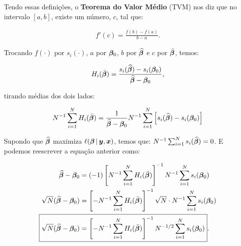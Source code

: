 \documentclass[11pt, oneside, a4paper, article]{article}
\numberwithin{equation}{section}
\begin{document}
\begin{description}
Tendo essas definições, o \textbf{Teorema do Valor Médio} (TVM) nos diz que no intervalo $[a, b]$, existe um número, $c$, tal que:

\vspace{-1 em}
\begin{align*}
f'(c) = \frac{f(b) - f(a)}{b - a}.
\end{align*}

\vspace{1 em}
\begin{center}
\end{center}
\vspace{1 em}

Trocando 
$f(\cdot)$ por $s_{i}(\cdot)$, 
$a$ por $\boldsymbol{\beta}_{0}$, 
$b$ por $\widehat{\boldsymbol{\beta}}$ e
$c$ por $\bar{\boldsymbol{\beta}}$,
temos:

\vspace{-1 em}
\begin{align*}
H_{i} ( \bar{\boldsymbol{\beta}} ) =
\frac{s_{i}( \widehat{\boldsymbol{\beta}} ) - s_{i}( \boldsymbol{\beta}_{0} )}{\widehat{\boldsymbol{\beta}} - \boldsymbol{\beta}_{0}},
\end{align*}

\noindent
tirando médias dos dois lados:

\vspace{-1 em}
\begin{align*}
N^{-1} \sum_{i=1}^{N} 
H_{i} ( \bar{\boldsymbol{\beta}} ) 
=
\frac{1}{\widehat{\boldsymbol{\beta}} - \boldsymbol{\beta}_{0}}
N^{-1} \sum_{i=1}^{N} 
\left[ 
s_{i}( \widehat{\boldsymbol{\beta}} ) - s_{i}( \boldsymbol{\beta}_{0} )
\right]
\end{align*}

Supondo que
$\widehat{\boldsymbol{\beta}}$
maximiza
$\ell (\boldsymbol{\beta} \, | \, \boldsymbol{y}, \boldsymbol{x})$,
temos que:
$N^{-1} \sum_{i=1}^{N} s_{i}(\widehat{\boldsymbol{\beta}}) = 0$.
E podemos reescrever a equação anterior como:

\vspace{-1 em}
\begin{align*}
\widehat{\betavec} - \betavec_{0}
&=
(-1)
\left[ N^{-1} \sum_{i=1}^{N} H_{i} ( \bar{\betavec} ) \right]^{-1}
N^{-1} \sum_{i=1}^{N} s_{i}( \betavec_{0} ) 
\\
\sqrt{N} ( \widehat{\betavec} - \betavec_{0} )
&=
\left[
- N^{-1} \sum_{i=1}^{N} H_{i} ( \bar{\betavec} )
\right]^{-1}
\sqrt{N} \cdot N^{-1} \sum_{i=1}^{N} s_{i}( \betavec_{0} ) 
\\
\Aboxed{
\sqrt{N} ( \widehat{\betavec} - \betavec_{0} )
&=
\left[
- N^{-1} \sum_{i=1}^{N} H_{i} ( \bar{\betavec} )
\right]^{-1}
N^{-1/2} \sum_{i=1}^{N} s_{i}( \betavec_{0} ) }.
\end{align*}


\end{description}
\end{document}
